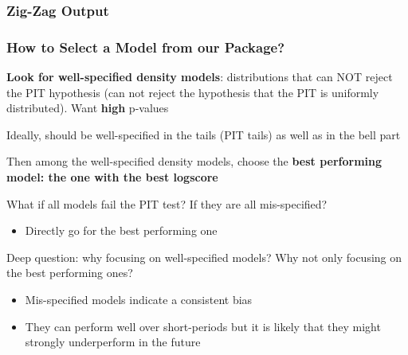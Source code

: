 \documentclass{beamer}
\newenvironment{wideenumerate}{\enumerate\addtolength{\itemsep}{10pt}}{\endenumerate}
\begin{document}
\begin{frame}
  \frametitle{Zig-Zag Output}
\end{frame}


\begin{frame}
  \frametitle{How to Select a Model from our Package?}
  \begin{wideenumerate}
  \item \textbf{Look for well-specified density models}: distributions that can NOT reject the PIT hypothesis (can not reject the hypothesis that the PIT is uniformly distributed). Want \textbf{high} p-values
    \item Ideally, should be well-specified in the tails (PIT tails) as well as in the bell part
    \item Then among the well-specified density models, choose the \textbf{best performing model: the one with the best logscore}
    \item What if all models fail the PIT test? If they are all mis-specified?
      \begin{itemize}
      \item Directly go for the best performing one
      \end{itemize}
    \item Deep question: why focusing on well-specified models? Why not only focusing on the best performing ones?
      \begin{itemize}
      \item Mis-specified models indicate a consistent bias
      \item They can perform well over short-periods but it is likely that they might strongly underperform in the future
      \end{itemize}
  \end{wideenumerate}
\end{frame}
\end{document}
